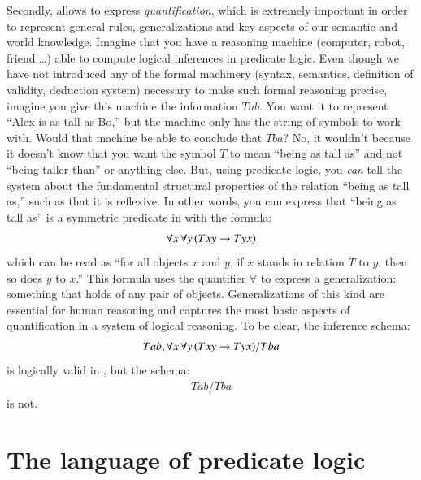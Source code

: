 \documentclass[nobib,nofonts]{tufte-handout}
\newcommand{\predlog}{\acro{PredLog}}
\begin{document}
Secondly, \predlog allows to express \emph{quantification}, which is extremely important in order to represent general rules, generalizations and key aspects of our semantic and world knowledge.
Imagine that you have a reasoning machine (computer, robot, friend \dots) able to compute logical inferences in predicate logic.
Even though we have not introduced any of the formal machinery (syntax, semantics, definition of validity, deduction system) necessary to make such formal reasoning precise, imagine you give this machine the information $Tab$.
You want it to represent ``Alex is as tall as Bo,'' but the machine only has the string of symbols to work with.
Would that machine be able to conclude that $Tba$?
No, it wouldn't because it doesn't know that you want the symbol $T$ to mean ``being as tall as'' and not ``being taller than'' or anything else.
But, using predicate logic, you \emph{can} tell the system about the fundamental structural properties of the relation ``being as tall as,'' such as that it is reflexive.
In other words, you can express that ``being as tall as'' is a symmetric predicate in with the \predlog formula:
\begin{align*}
 \forall x \thinspace \forall y \thinspace (Txy \rightarrow Tyx)
\end{align*}
which can be read as ``for all objects $x$ and $y$, if $x$ stands in relation $T$ to $y$, then so does $y$ to $x$.''
This formula uses the quantifier \(\forall\) to express a generalization: something that holds of any pair of objects.
Generalizations of this kind are essential for human reasoning and \predlog captures the most basic aspects of quantification in a system of logical reasoning.
To be clear, the inference schema:
\begin{align*}
 Tab, \forall x \thinspace \forall y \thinspace (Txy \rightarrow Tyx) / Tba
\end{align*}
is logically valid in \predlog, but the schema:
\begin{align*}
 Tab / Tba
\end{align*}
is not.

\section{The language of predicate logic}
\end{document}
